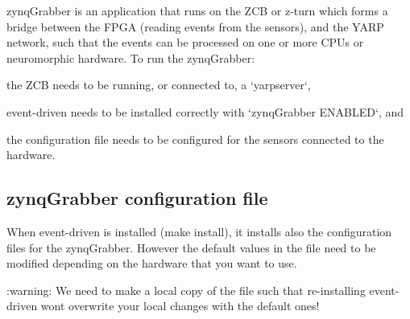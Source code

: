 {\ttfamily zynq\+Grabber} is an application that runs on the Z\+CB or z-\/turn which forms a bridge between the F\+P\+GA (reading events from the sensors), and the {\ttfamily Y\+A\+RP} network, such that the events can be processed on one or more C\+P\+Us or neuromorphic hardware. To run the {\ttfamily zynq\+Grabber}\+:
\begin{DoxyItemize}
\item the Z\+CB needs to be running, or connected to, a `yarpserver`,
\item {\ttfamily event-\/driven} needs to be installed correctly with `zynq\+Grabber E\+N\+A\+B\+L\+E\+D`, and
\item the configuration file needs to be configured for the sensors connected to the hardware.
\end{DoxyItemize}

\subsection*{{\ttfamily zynq\+Grabber} configuration file}

When {\ttfamily event-\/driven} is installed ({\ttfamily make install}), it installs also the configuration files for the {\ttfamily zynq\+Grabber}. However the default values in the file need to be modified depending on the hardware that you want to use.

\+:warning\+: We need to make a local copy of the file such that re-\/installing {\ttfamily event-\/driven} won\textquotesingle{}t overwrite your local changes with the default ones!

